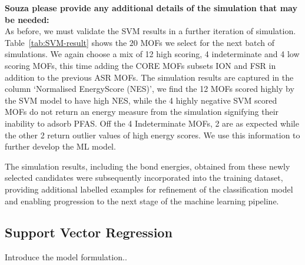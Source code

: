 \documentclass[twoside,twocolumn,9pt]{article}
\begin{document}
\textcolor{myred}{\textbf{Souza please provide any additional details of the simulation that may be needed:}}\\
As before, we must validate the SVM results in a further iteration of simulation. Table~\ref{tab:SVM-result} shows the $20$ MOFs we select for the next batch of simulations. We again choose a mix of 12 high scoring, 4 indeterminate and 4 low scoring MOFs, this time adding the CORE MOFs subsets ION and FSR in addition to the previous ASR MOFs. The simulation results are captured in the column `Normalised EnergyScore (NES)', \textcolor{myred}{we find the 12 MOFs scored highly by the SVM model to have high NES, while the 4 highly negative SVM scored MOFs do not return an energy measure from the simulation signifying their inability to adsorb PFAS. Off the 4 Indeterminate MOFs, 2 are as expected while the other 2 return outlier values of high energy scores. We use this information to further develop the ML model.}

The simulation results, including the bond energies, obtained from these newly selected candidates were subsequently incorporated into the training dataset, providing additional labelled examples for refinement of the classification model and enabling progression to the next stage of the machine learning pipeline.

\subsection{Support Vector Regression}

Introduce the model formulation..
\end{document}
